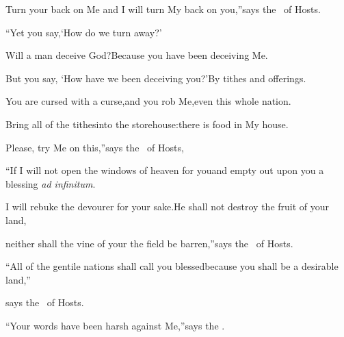 \begin{inparaenum}
  \pb Turn your back on Me and I will turn My back on you,''\pa says the \lord\ of Hosts.%
  
  \pb ``Yet you say,\pa `How do we turn away?'%
  
  \pa {} Will a man deceive%
  God?\pa Because you have been deceiving Me.%
  
  \pb But you say, `How have we been deceiving you?'\pa By tithes and offerings.%
  
  \pa {} You are cursed with a curse,\pa and you rob Me,\pa even this whole nation.%
  
  \pa {} Bring all of the tithes\pa into the storehouse:\pa there is food in My house.%
  
  \pb Please, try Me on this,''\pa says the \lord\ of Hosts,%
  
  \pb ``If I will not open the windows of heaven for you\pa and empty out upon you a blessing \textit{ad infinitum}.%
  
  \pa {} I will rebuke the devourer for your sake.\pa He shall not destroy the fruit of your land,%
  
  \pb neither shall the vine of your the field be barren,''\pa says the \lord\ of Hosts.%
  
  \pa {} ``All of the gentile nations shall call you blessed\pa because you shall be a desirable land,''%
  
  \pa says the \lord\ of Hosts.%
  
  \pa {} ``Your words have been harsh against Me,''\pa says the \lord.%
  

\end{inparaenum}

